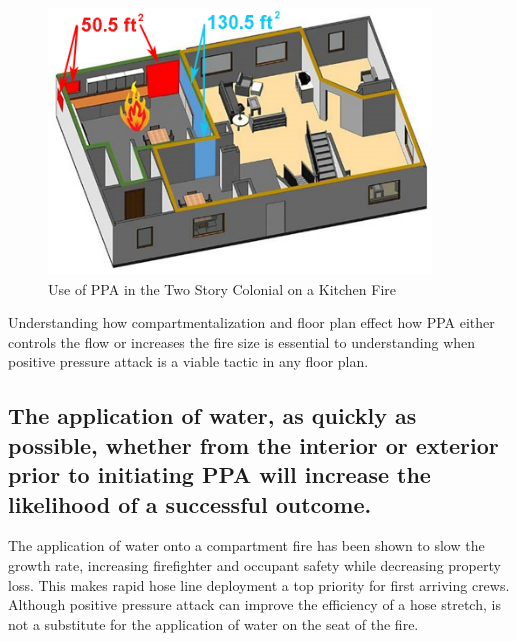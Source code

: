 \documentclass{article}
\begin{document}
\begin{figure}[H]
	\centering
	\includegraphics[width = 4in]{0_Images/Tactical_Considerations/Compartmentalization/Kitchen_Fire.png}
	\caption{Use of PPA in the Two Story Colonial on a Kitchen Fire}
	\label{fig:TwoStoryKitchenFire}
\end{figure}

Understanding how compartmentalization and floor plan effect how PPA either controls the flow or increases the fire size is essential to understanding when positive pressure attack is a viable tactic in any floor plan.

\subsection{The application of water, as quickly as possible, whether from the interior or exterior prior to initiating PPA will increase the likelihood of a successful outcome.} \label{sec:EarlyApplication}
The application of water onto a compartment fire has been shown to slow the growth rate, increasing firefighter and occupant safety while decreasing property loss. This makes rapid hose line deployment a top priority for first arriving crews. Although positive pressure attack can improve the efficiency of a hose stretch, is not a substitute for the application of water on the seat of the fire.  
\end{document}
